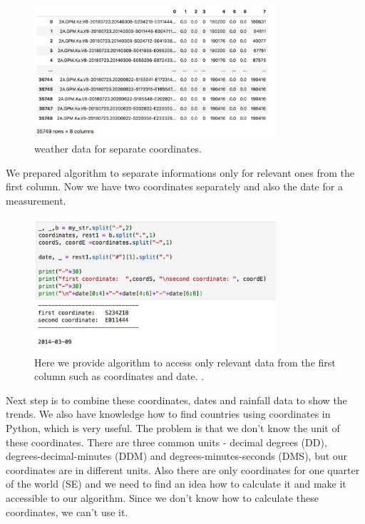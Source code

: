 \begin{figure}[htb]
	\begin{center}
		\includegraphics[width=0.8\textwidth]{weather/weather_data.pdf}
		\caption{weather data for separate coordinates.}
		\label{fig:Here we can find lot's of data and some of them are irrelevant to us. In column one we notice coordinates and date.}
	\end{center}
\end{figure}

We prepared algorithm to separate informations only for relevant ones from the first column. Now we have two coordinates separately and also the date for a measurement. 

\begin{figure}[htb]
	\begin{center}
		\includegraphics[width=0.8\textwidth]{weather/weather_split_data.pdf}
		\caption{Here we provide algorithm to access only relevant data from the first column such as coordinates and date. .}
		\label{fig:pSeparate coordinates and date}
	\end{center}
\end{figure}

Next step is to combine these coordinates, dates and rainfall data to show the trends. We also have knowledge how to find countries using coordinates in Python, which is very useful. The problem is that we don't know the unit of these coordinates. There are three common units - decimal degrees (DD), degrees-decimal-minutes (DDM) and degrees-minutes-seconds (DMS), but our coordinates are in different units. Also there are only coordinates for one quarter of the world (SE) and we need to find an idea how to calculate it and make it accessible to our algorithm. Since we don't know how to calculate these coordinates, we can't use it. 

